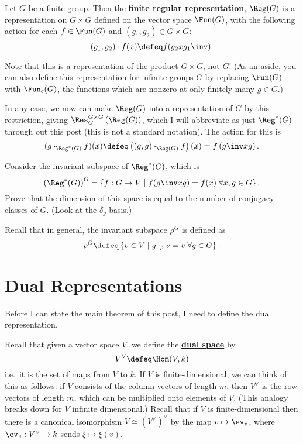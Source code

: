 \begin{definition}
	Let $G$ be a finite group.
	Then the \textbf{finite regular representation}, $\Reg(G)$ is a representation on $G \times G$ defined on the vector space $\Fun(G)$, with the following action for each $f \in \Fun(G)$ and $(g_1, g_2) \in G \times G$:
	\[ ( g_1, g_2 ) \cdot f(x) \defeq f(g_2 x g_1\inv). \]
\end{definition}
Note that this is a representation of the \href{http://en.wikipedia.org/wiki/Direct_product_of_groups}{product} $G \times G$, not $G$!
(As an aside, you can also define this representation for infinite groups $G$ by replacing $\Fun(G)$ with $\Fun_c(G)$, the functions which are nonzero at only finitely many $g \in G$.)

In any case, we now can make $\Reg(G)$ into a representation of $G$ by this restriction, giving $\Res_G^{G \times G} \left( \Reg(G) \right)$,
which I will abbreviate as just $\Reg^\ast(G)$ through out this post (this is not a standard notation).
The action for this is
\[
	(g \cdot_{\Reg^\ast(G)} f)(x)
	\defeq
	\left( (g, g) \cdot_{\Reg(G)} f \right)(x)
	= f\left( g\inv x g \right).
\]

\begin{ques}
	Consider the invariant subspace of $\Reg^\ast(G)$, which is
	\[ \left( \Reg^\ast(G) \right)^G
		=
		\left\{ f : G \to V \mid f(g\inv x g) = f(x) \; \forall x,g \in G \right\}.
	\]
	Prove that the dimension of this space is equal to the number of conjugacy classes of $G$.
	(Look at the $\delta_g$ basis.)
\end{ques}
Recall that in general, the invariant subspace $\rho^G$
is defined as \[ \rho^G \defeq \left\{ v \in V \mid g \cdot_\rho v = v \; \forall g \in G \right\}. \]

\section{Dual Representations}
Before I can state the main theorem of this post, I need to define the dual representation.

Recall that given a vector space $V$, we define the \href{http://en.wikipedia.org/wiki/Dual_space}{\textbf{dual space}} by
\[ V^\vee \defeq \Hom(V,k) \]
i.e.\ it is the set of maps from $V$ to $k$.
If $V$ is finite-dimensional, we can think of this as follows:
if $V$ consists of the column vectors of length $m$, then $V^\vee$ is the row vectors of length $m$, which can be multiplied onto elements of $V$.
(This analogy breaks down for $V$ infinite dimensional.)
Recall that if $V$ is finite-dimensional then there is a canonical isomorphism $V \simeq (V^\vee)^\vee$ by the map $v \mapsto \ev_v$,
where $\ev_v : V^\vee \to k$ sends $\xi \mapsto \xi(v)$.

